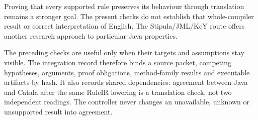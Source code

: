 \begin{MapDiagram}
\end{MapDiagram}

Proving that every supported rule preserves its behaviour through translation
remains a stronger goal. The present checks do not establish that whole-compiler
result or correct interpretation of English. The Stipula/JML/KeY route offers
another research approach to particular Java properties.

\clearpage
{}
The preceding checks are useful only when their targets and assumptions stay
visible. The integration record therefore binds a source packet, competing
hypotheses, arguments, proof obligations, method-family results and executable
artifacts by hash. It also records shared dependencies: agreement between Java
and Catala after the same RuleIR lowering is a translation check, not two
independent readings. The controller never changes an unavailable, unknown or
unsupported result into agreement.

